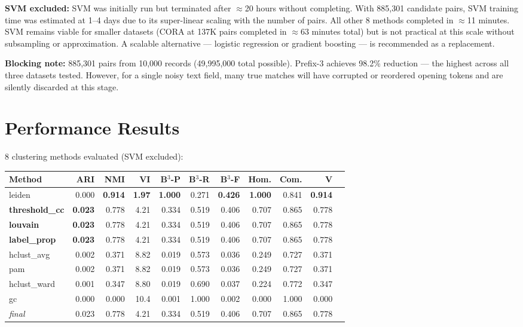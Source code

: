 \documentclass[11pt, a4paper]{article}
\begin{document}
\textbf{SVM excluded:} SVM was initially run but terminated after $\approx$20 hours
without completing. With 885,301 candidate pairs, SVM training time was estimated at
1--4 days due to its super-linear scaling with the number of pairs. All other 8 methods
completed in $\approx$11 minutes. SVM remains viable for smaller datasets (CORA at
137K pairs completed in $\approx$63 minutes total) but is not practical at this scale
without subsampling or approximation. A scalable alternative --- logistic regression or
gradient boosting --- is recommended as a replacement.

\textbf{Blocking note:} 885,301 pairs from 10,000 records (49,995,000 total possible).
Prefix-3 achieves 98.2\% reduction --- the highest across all three datasets tested.
However, for a single noisy text field, many true matches will have corrupted or
reordered opening tokens and are silently discarded at this stage.

\section{Performance Results}

8 clustering methods evaluated (SVM excluded):

\begin{table}[h!]
\centering
\small
\setlength{\tabcolsep}{4pt}
\begin{tabular}{lrrrrrrrrrr}
\toprule
\textbf{Method} & \textbf{ARI} & \textbf{NMI} & \textbf{VI} &
\textbf{B$^3$-P} & \textbf{B$^3$-R} & \textbf{B$^3$-F} &
\textbf{Hom.} & \textbf{Com.} & \textbf{V} \\
\midrule
leiden           & 0.000 & \textbf{0.914} & \textbf{1.97} & \textbf{1.000} & 0.271 & \textbf{0.426} & \textbf{1.000} & 0.841 & \textbf{0.914} \\
\textbf{threshold\_cc} & \textbf{0.023} & 0.778 & 4.21 & 0.334 & 0.519 & 0.406 & 0.707 & 0.865 & 0.778 \\
\textbf{louvain} & \textbf{0.023} & 0.778 & 4.21 & 0.334 & 0.519 & 0.406 & 0.707 & 0.865 & 0.778 \\
\textbf{label\_prop} & \textbf{0.023} & 0.778 & 4.21 & 0.334 & 0.519 & 0.406 & 0.707 & 0.865 & 0.778 \\
hclust\_avg      & 0.002 & 0.371 & 8.82 & 0.019 & 0.573 & 0.036 & 0.249 & 0.727 & 0.371 \\
pam              & 0.002 & 0.371 & 8.82 & 0.019 & 0.573 & 0.036 & 0.249 & 0.727 & 0.371 \\
hclust\_ward     & 0.001 & 0.347 & 8.80 & 0.019 & 0.690 & 0.037 & 0.224 & 0.772 & 0.347 \\
gc               & 0.000 & 0.000 & 10.4 & 0.001 & 1.000 & 0.002 & 0.000 & 1.000 & 0.000 \\
\midrule
\textit{final}   & 0.023 & 0.778 & 4.21 & 0.334 & 0.519 & 0.406 & 0.707 & 0.865 & 0.778 \\
\bottomrule
\end{tabular}
\end{table}
\end{document}
